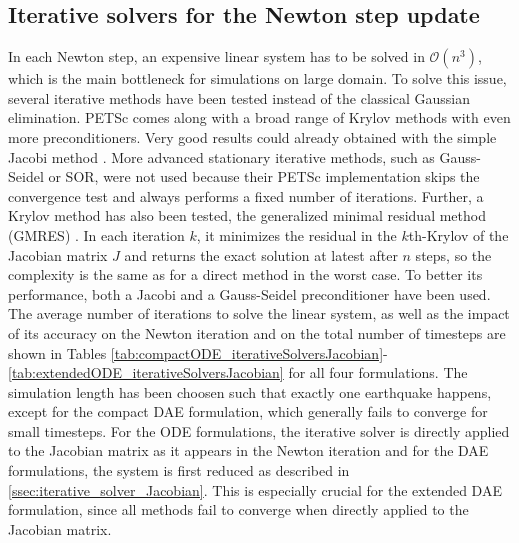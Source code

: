 \subsection{Iterative solvers for the Newton step update}
In each Newton step, an expensive linear system has to be solved in $\mathcal{O}\left(n^3\right)$, which is the main bottleneck for simulations on large domain. To solve this issue, several iterative methods have been tested  instead of the classical Gaussian elimination. PETSc comes along with a broad range of Krylov methods with even more preconditioners. Very good results could already obtained with the simple Jacobi method \cite[p. 230]{IterativeSolutionMethods}. More advanced stationary iterative methods, such as Gauss-Seidel or SOR, were not used because their PETSc implementation skips the convergence test and always performs a fixed number of iterations. Further, a Krylov method has also been tested, the generalized minimal residual method (GMRES) \cite{GMRES}. In each iteration $k$, it minimizes the residual in the $k$th-Krylov of the Jacobian matrix $J$ and returns the exact solution at latest after $n$ steps, so the complexity is the same as for a direct method in the worst case. To better its performance, both a Jacobi and a Gauss-Seidel preconditioner have been used. \\
The average number of iterations to solve the linear system, as well as the impact of its accuracy on the Newton iteration and on the total number of timesteps are shown in Tables \ref{tab:compactODE_iterativeSolversJacobian}-\ref{tab:extendedODE_iterativeSolversJacobian} for all four formulations. The simulation length has been choosen such that exactly one earthquake happens, except for the compact DAE formulation, which generally fails to converge for small timesteps. For the ODE formulations, the iterative solver is directly applied to the Jacobian matrix as it appears in the Newton iteration and for the DAE formulations, the system is first reduced as described in \autoref{ssec:iterative_solver_Jacobian}. This is especially crucial for the extended DAE formulation, since all methods fail to converge when directly applied to the Jacobian matrix. 


